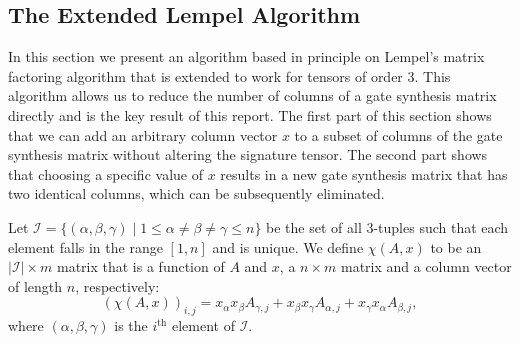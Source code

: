 \documentclass{article}
\theoremstyle{definition}
\theoremstyle{problem}
\theoremstyle{lemma}
\begin{document}
		
		
		\FloatBarrier
		\subsection{The Extended Lempel Algorithm}
		In this section we present an algorithm based in principle on Lempel's matrix factoring algorithm that is extended to work for tensors of order 3. This algorithm allows us to reduce the number of columns of a gate synthesis matrix directly and is the key result of this report. The first part of this section shows that we can add an arbitrary column vector $x$ to a subset of columns of the gate synthesis matrix without altering the signature tensor. The second part shows that choosing a specific value of $x$ results in a new gate synthesis matrix that has two identical columns, which can be subsequently eliminated.
		
		
		
		
		
		
		
		
		Let $\mathcal{I} = \{\left(\alpha,\beta,\gamma\right)\mid 1 \leq \alpha \neq \beta \neq \gamma \leq n\}$ be the set of all 3-tuples such that each element falls in the range $\left[1,n\right]$ and is unique. We define $\chi(A,x)$ to be an $|\mathcal{I}| \times m$ matrix that is a function of $A$ and $x$, a $n \times m$ matrix and a column vector of length $n$, respectively:
		\begin{equation}
		\label{e_chi}
		\left(\chi(A,x)\right)_{i,j} = x_\alpha x_\beta A_{\gamma,j} + x_\beta x_\gamma A_{\alpha,j} + x_\gamma x_\alpha A_{\beta,j},
		\end{equation}
		where $\left(\alpha,\beta,\gamma\right)$ is the $i^\text{th}$ element of $\mathcal{I}$.
		
\end{document}
